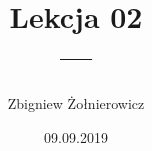 \documentclass[a4paper]{article}
\begin{document}
\title{{\huge Lekcja 02} \\
{\large ---}}
\author{Zbigniew Żołnierowicz}
\date{09.09.2019}
\maketitle
\end{document}
